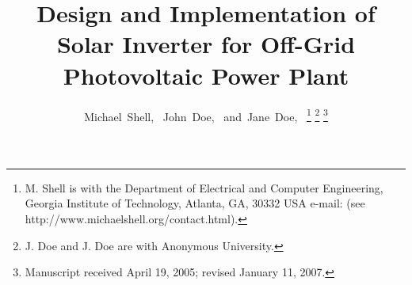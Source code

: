 \documentclass[journal]{IEEEtran}
\begin{document}
			      \title{Design and Implementation of Solar Inverter for Off-Grid Photovoltaic Power Plant}

			      \author{Michael~Shell,~
			              John~Doe,~
				              and~Jane~Doe,~%
					      \thanks{M. Shell is with the Department
					      of Electrical and Computer Engineering, Georgia Institute of Technology, Atlanta,
					      GA, 30332 USA e-mail: (see http://www.michaelshell.org/contact.html).}%
					      \thanks{J. Doe and J. Doe are with Anonymous University.}%
					      \thanks{Manuscript received April 19, 2005; revised January 11, 2007.}}

\end{document}
